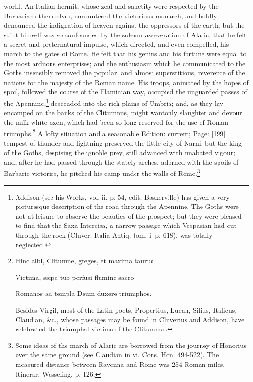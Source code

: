 world. An Italian hermit, whose zeal and sanctity were respected by the Barbarians themselves, encountered the victorious monarch, and boldly denounced the indignation of heaven against the oppressors of the earth; but the saint himself was so confounded by the solemn asseveration of Alaric, that he felt a secret and preternatural impulse, which directed, and even compelled, his march to the gates of Rome. He felt that his genius and his fortune were equal to the most arduous enterprises; and the enthusiasm which he communicated to the Goths insensibly removed the popular, and almost superstitious, reverence of the nations for the majesty of the Roman name. His troops, animated by the hopes of spoil, followed the course of the Flaminian way, occupied the unguarded passes of the Apennine,\footnote{Addison (see his Works, vol. ii. p. 54, edit. Baskerville) has given a very picturesque description of the road through the Apennine. The Goths were not at leisure to observe the beauties of the prospect; but they were pleased to find that the Saxa Intercisa, a narrow passage which Vespasian had cut through the rock (Cluver. Italia Antiq. tom. i. p. 618), was totally neglected.} descended into the rich plains of Umbria; and, as they lay encamped on the banks of the Clitumnus, might wantonly slaughter and devour the milk-white oxen, which had been so long reserved for the use of Roman triumphs.\footnote{Hinc albi, Clitumne, greges, et maxima taurus

Victima, sæpe tuo perfusi flumine sacro

Romanos ad templa Deum duxere triumphos.

Besides Virgil, most of the Latin poets, Propertius, Lucan, Silius, Italicus, Claudian, \&c., whose passages may be found in Cluverius and Addison, have celebrated the triumphal victims of the Clitumnus.} A lofty situation and a seasonable Edition: current; Page: [199] tempest of thunder and lightning preserved the little city of Narni; but the king of the Goths, despising the ignoble prey, still advanced with unabated vigour; and, after he had passed through the stately arches, adorned with the spoils of Barbaric victories, he pitched his camp under the walls of Rome.\footnote{Some ideas of the march of Alaric are borrowed from the journey of Honorius over the same ground (see Claudian in vi. Cons. Hon. 494-522). The measured distance between Ravenna and Rome was 254 Roman miles. Itinerar. Wesseling, p. 126.}

